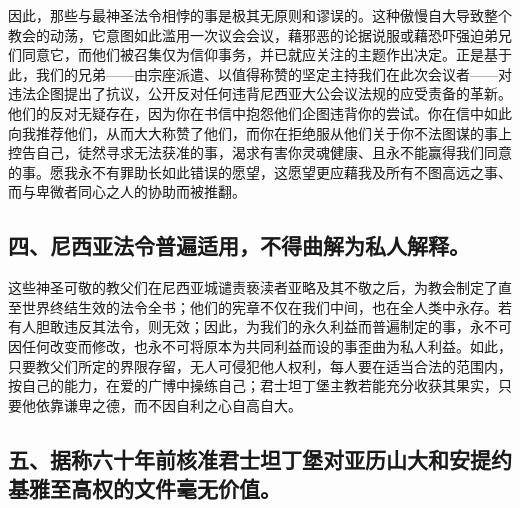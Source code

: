 因此，那些与最神圣法令相悖的事是极其无原则和谬误的。这种傲慢自大导致整个教会的动荡，它意图如此滥用一次议会会议，藉邪恶的论据说服或藉恐吓强迫弟兄们同意它，而他们被召集仅为信仰事务，并已就应关注的主题作出决定。正是基于此，我们的兄弟——由宗座派遣、以值得称赞的坚定主持我们在此次会议者——对违法企图提出了抗议，公开反对任何违背尼西亚大公会议法规的应受责备的革新。他们的反对无疑存在，因为你在书信中抱怨他们企图违背你的尝试。你在信中如此向我推荐他们，从而大大称赞了他们，而你在拒绝服从他们关于你不法图谋的事上控告自己，徒然寻求无法获准的事，渴求有害你灵魂健康、且永不能赢得我们同意的事。愿我永不有罪助长如此错误的愿望，这愿望更应藉我及所有不图高远之事、而与卑微者同心之人的协助而被推翻。\par


\subsection{四、尼西亚法令普遍适用，不得曲解为私人解释。}

这些神圣可敬的教父们在尼西亚城谴责亵渎者亚略及其不敬之后，为教会制定了直至世界终结生效的法令全书；他们的宪章不仅在我们中间，也在全人类中永存。若有人胆敢违反其法令，则无效；因此，为我们的永久利益而普遍制定的事，永不可因任何改变而修改，也永不可将原本为共同利益而设的事歪曲为私人利益。如此，只要教父们所定的界限存留，无人可侵犯他人权利，每人要在适当合法的范围内，按自己的能力，在爱的广博中操练自己；君士坦丁堡主教若能充分收获其果实，只要他依靠谦卑之德，而不因自利之心自高自大。\par


\subsection{五、据称六十年前核准君士坦丁堡对亚历山大和安提约基雅至高权的文件毫无价值。}

